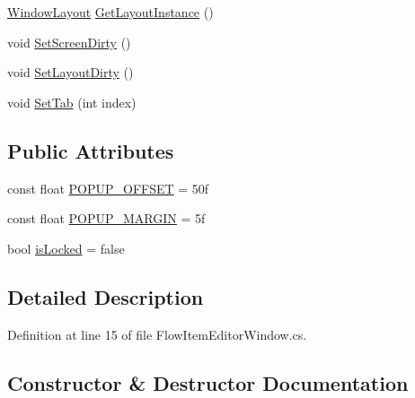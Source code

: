 \begin{DoxyCompactItemize}
\item 
\hyperlink{class_unity_engine_1_1_u_i_1_1_windows_1_1_window_layout}{Window\+Layout} \hyperlink{class_unity_editor_1_1_u_i_1_1_windows_1_1_plugins_1_1_flow_1_1_flow_scene_item_ae5b5a2783f03171389d6dd7927b4bd5d}{Get\+Layout\+Instance} ()
\item 
void \hyperlink{class_unity_editor_1_1_u_i_1_1_windows_1_1_plugins_1_1_flow_1_1_flow_scene_item_a08e3b0134b36734c229fbcaee7ed522c}{Set\+Screen\+Dirty} ()
\item 
void \hyperlink{class_unity_editor_1_1_u_i_1_1_windows_1_1_plugins_1_1_flow_1_1_flow_scene_item_ab1c242cd3c0725757aa846acd5d64ad6}{Set\+Layout\+Dirty} ()
\item 
void \hyperlink{class_unity_editor_1_1_u_i_1_1_windows_1_1_plugins_1_1_flow_1_1_flow_scene_item_a308685d99fe019371b824dc5733e4b87}{Set\+Tab} (int index)
\end{DoxyCompactItemize}
\subsection*{Public Attributes}
\begin{DoxyCompactItemize}
\item 
const float \hyperlink{class_unity_editor_1_1_u_i_1_1_windows_1_1_plugins_1_1_flow_1_1_flow_scene_item_accd612d28da113e147453fbe170fbb5f}{P\+O\+P\+U\+P\+\_\+\+O\+F\+F\+S\+E\+T} = 50f
\item 
const float \hyperlink{class_unity_editor_1_1_u_i_1_1_windows_1_1_plugins_1_1_flow_1_1_flow_scene_item_a96b2e76f41baf312d389630976c1f33d}{P\+O\+P\+U\+P\+\_\+\+M\+A\+R\+G\+I\+N} = 5f
\item 
bool \hyperlink{class_unity_editor_1_1_u_i_1_1_windows_1_1_plugins_1_1_flow_1_1_flow_scene_item_ace9a74177265518de67f01146e5c4c9d}{is\+Locked} = false
\end{DoxyCompactItemize}


\subsection{Detailed Description}


Definition at line 15 of file Flow\+Item\+Editor\+Window.\+cs.



\subsection{Constructor \& Destructor Documentation}
\hypertarget{class_unity_editor_1_1_u_i_1_1_windows_1_1_plugins_1_1_flow_1_1_flow_scene_item_a2fcc5192330be1366a79d5efb5af6f79}{}
